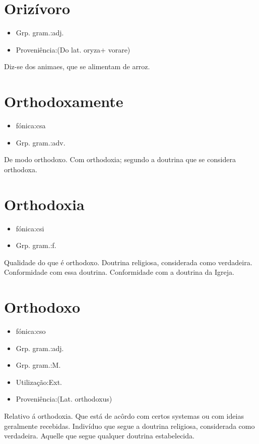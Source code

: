 \section{Orizívoro}
\begin{itemize}
\item {Grp. gram.:adj.}
\end{itemize}
\begin{itemize}
\item {Proveniência:(Do lat. \textunderscore oryza\textunderscore  + \textunderscore vorare\textunderscore )}
\end{itemize}
Diz-se dos animaes, que se alimentam de arroz.
\section{Orthodoxamente}
\begin{itemize}
\item {fónica:csa}
\end{itemize}
\begin{itemize}
\item {Grp. gram.:adv.}
\end{itemize}
De modo orthodoxo.
Com orthodoxia; segundo a doutrina que se considera orthodoxa.
\section{Orthodoxia}
\begin{itemize}
\item {fónica:csi}
\end{itemize}
\begin{itemize}
\item {Grp. gram.:f.}
\end{itemize}
Qualidade do que é orthodoxo.
Doutrina religiosa, considerada como verdadeira.
Conformidade com essa doutrina.
Conformidade com a doutrina da Igreja.
\section{Orthodoxo}
\begin{itemize}
\item {fónica:cso}
\end{itemize}
\begin{itemize}
\item {Grp. gram.:adj.}
\end{itemize}
\begin{itemize}
\item {Grp. gram.:M.}
\end{itemize}
\begin{itemize}
\item {Utilização:Ext.}
\end{itemize}
\begin{itemize}
\item {Proveniência:(Lat. \textunderscore orthodoxus\textunderscore )}
\end{itemize}
Relativo á orthodoxia.
Que está de acôrdo com certos systemas ou com ideias geralmente recebidas.
Indivíduo que segue a doutrina religiosa, considerada como verdadeira.
Aquelle que segue qualquer doutrina estabelecida.
